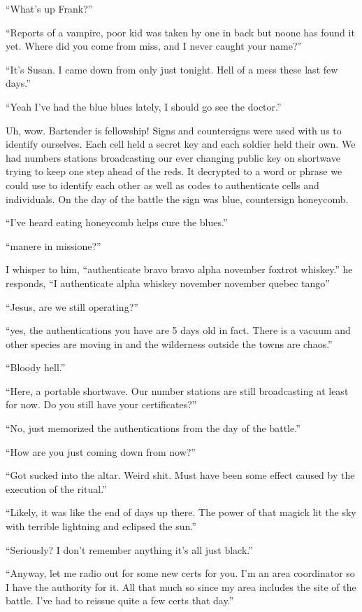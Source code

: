 ``What's up Frank?''

``Reports of a vampire, poor kid was taken by one in back but noone has found it yet. Where did you come from miss, and I never caught your name?''

``It's Susan. I came down from \chichenitza only just tonight. Hell of a mess these last few days.''

``Yeah I've had the blue blues lately, I should go see the doctor.''

Uh, wow. Bartender is fellowship! Signs and countersigns were used with us to identify ourselves. Each cell held a secret key and each soldier held their own. We had numbers stations broadcasting our ever changing public key on shortwave trying to keep one step ahead of the reds. It decrypted to a word or phrase we could use to identify each other as well as codes to authenticate cells and individuals. On the day of the battle the sign was blue, countersign honeycomb.

``I've heard eating honeycomb helps cure the blues.''

``manere in missione?''

I whisper to him, ``authenticate bravo bravo alpha november foxtrot whiskey.''
he responds, ``I authenticate alpha whiskey november november quebec tango''

``Jesus, are we still operating?''

``yes, the authentications you have are 5 days old in fact. There is a vacuum and other species are moving in and the wilderness outside the towns are chaos.''

``Bloody hell.''

``Here, a portable shortwave. Our number stations are still broadcasting at least for now. Do you still have your certificates?''

``No, just memorized the authentications from the day of the battle.''

``How are you just coming down from \chichenitza now?''

``Got sucked into the altar. Weird shit. Must have been some effect caused by the execution of the ritual.''

``Likely, it was like the end of days up there. The power of that magick lit the sky with terrible lightning and eclipsed the sun.''

``Seriously? I don't remember anything it's all just black.''

``Anyway, let me radio out for some new certs for you. I'm an area coordinator so I have the authority for it. All that much so since my area includes the site of the battle. I've had to reissue quite a few certs that day.''

